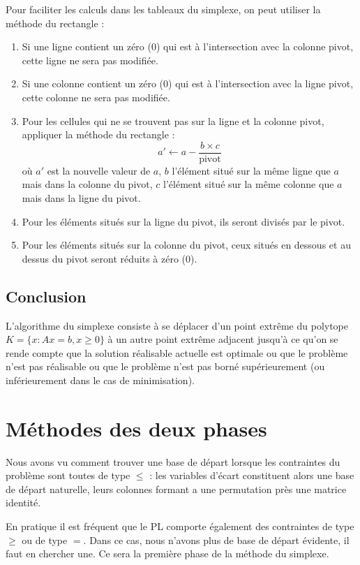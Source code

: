 \documentclass[a4paper,12pt,openany]{book}
\theoremstyle{plain}
\theoremstyle{definition}
\theoremstyle{remark}
\theoremstyle{nbstyle}
\begin{document}
	Pour faciliter les calculs dans les tableaux du simplexe, on peut utiliser la méthode du rectangle :
	
	\begin{enumerate}
		\item Si une ligne contient un zéro (0) qui est à l'intersection avec la colonne pivot, cette ligne ne sera pas modifiée.
		
		\item Si une colonne contient un zéro (0) qui est à l'intersection avec la ligne pivot, cette colonne ne sera pas modifiée.
		
		\item Pour les cellules qui ne se trouvent pas sur la ligne et la colonne pivot, appliquer la méthode du rectangle :
		$$a' \leftarrow a - \frac{b \times c}{\text{pivot}}$$
		où $a'$ est la nouvelle valeur de $a$, $b$ l'élément situé sur la même ligne que $a$ mais dans la colonne du pivot, $c$ l'élément situé sur la même colonne que $a$ mais dans la ligne du pivot.
		
		\item Pour les éléments situés sur la ligne du pivot, ils seront divisés par le pivot.
		
		\item Pour les éléments situés sur la colonne du pivot, ceux situés en dessous et au dessus du pivot seront réduits à zéro (0).
	\end{enumerate}
	
	\subsection{Conclusion}
	L'algorithme du simplexe consiste à se déplacer d'un point extrême du polytope $K=\{x: A x= b, x \geq 0\}$ à un autre point extrême adjacent jusqu'à ce qu'on se rende compte que la solution réalisable actuelle est optimale ou que le problème n'est pas réalisable ou que le problème n'est pas borné supérieurement (ou inférieurement dans le cas de minimisation).
	
	\section{Méthodes des deux phases}
	Nous avons vu comment trouver une base de départ lorsque les contraintes du problème sont toutes de type $\leq$ : les variables d'écart constituent alors une base de départ naturelle, leurs colonnes formant a une permutation près une matrice identité.
	
	En pratique il est fréquent que le PL comporte également des contraintes de type $\geq$ ou de type $=$. Dans ce cas, nous n'avons plus de base de départ évidente, il faut en chercher une. Ce sera la première phase de la méthode du simplexe.
	
\end{document}
